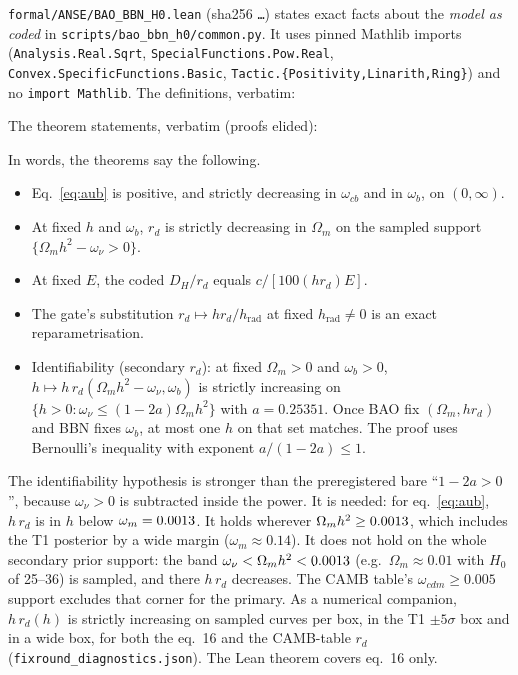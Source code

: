 \documentclass[11pt]{article}
\begin{document}
\texttt{formal/ANSE/BAO\_BBN\_H0.lean} (sha256 \texttt{\LeanShaShort\ldots})
states exact facts about the \emph{model as coded} in
\texttt{scripts/bao\_bbn\_h0/common.py}. It uses pinned Mathlib imports
(\texttt{Analysis.Real.Sqrt}, \texttt{SpecialFunctions.Pow.Real},
\texttt{Convex.SpecificFunctions.Basic},
\texttt{Tactic.\{Positivity,Linarith,Ring\}}) and no \texttt{import Mathlib}.
The definitions, verbatim:

The \LeanNThm{} theorem statements, verbatim (proofs elided):

In words, the theorems say the following.
\begin{itemize}
\item Eq.~\eqref{eq:aub} is positive, and strictly decreasing in
  $\omega_{cb}$ and in $\omega_b$, on $(0,\infty)$.
\item At fixed $h$ and $\omega_b$, $r_d$ is strictly decreasing in
  $\Omega_m$ on the sampled support $\{\Omega_m h^2-\omega_\nu>0\}$.
\item At fixed $E$, the coded $D_H/r_d$ equals $c/[100(h r_d)E]$.
\item The gate's substitution $r_d\mapsto h r_d/h_\mathrm{rad}$ at fixed
  $h_\mathrm{rad}\neq0$ is an exact reparametrisation.
\item Identifiability (secondary $r_d$): at fixed $\Omega_m>0$ and
  $\omega_b>0$, $h\mapsto h\,r_d(\Omega_m h^2-\omega_\nu,\omega_b)$ is
  strictly increasing on $\{h>0:\omega_\nu\le(1-2a)\Omega_m h^2\}$ with
  $a=0.25351$. Once BAO fix $(\Omega_m, h r_d)$ and BBN fixes $\omega_b$, at
  most one $h$ on that set matches. The proof uses Bernoulli's inequality with exponent
  $a/(1-2a)\le1$.
\end{itemize}
The identifiability hypothesis is stronger than the preregistered bare
``$1-2a>0$'', because $\omega_\nu>0$ is subtracted inside the power. It is
needed: for eq.~\eqref{eq:aub}, $h\,r_d$ is \MonoBelowDec{} in $h$ below
$\omega_m=0.0013$. It holds wherever $\Omega_m h^2\ge0.0013$, which
includes the T1 posterior by a wide margin ($\omega_m\approx0.14$). It does
not hold on the whole secondary prior support: the band
$\omega_\nu<\Omega_m h^2<0.0013$ (e.g.\ $\Omega_m\approx0.01$ with $H_0$
of 25--36) is sampled, and there $h\,r_d$ decreases. The CAMB table's
$\omega_{cdm}\ge0.005$ support excludes that corner for the primary. As a numerical
companion, $h\,r_d(h)$ is strictly increasing on \MonoAllOk{} \MonoN{}
sampled curves per box, in the T1 $\pm5\sigma$ box and in a wide box, for
both the eq.~16 and the CAMB-table $r_d$
(\texttt{fixround\_diagnostics.json}). The Lean theorem covers eq.~16 only.
\end{document}

